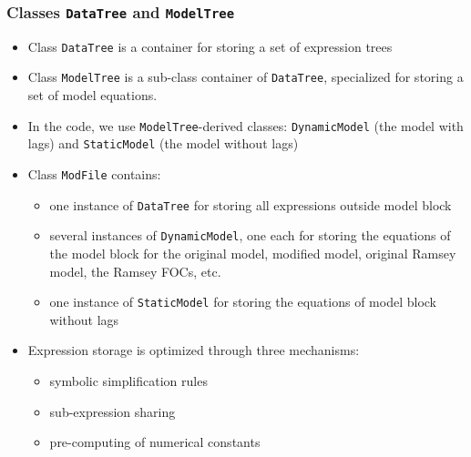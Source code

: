 \documentclass{beamer}
\begin{document}
\begin{frame}
  \frametitle{Classes \texttt{DataTree} and \texttt{ModelTree}}
  \begin{itemize}
  \item Class \texttt{DataTree} is a container for storing a set of expression trees
  \item Class \texttt{ModelTree} is a sub-class container of \texttt{DataTree}, specialized for storing a set of model equations.
  \item In the code, we use \texttt{ModelTree}-derived classes: \texttt{DynamicModel} (the model with lags) and \texttt{StaticModel} (the model without lags)
  \item Class \texttt{ModFile} contains:
    \begin{itemize}
    \item one instance of \texttt{DataTree} for storing all expressions outside model block
    \item several instances of \texttt{DynamicModel}, one each for storing the equations of the model block for the original model, modified model, original Ramsey model, the Ramsey FOCs, etc.
    \item one instance of \texttt{StaticModel} for storing the equations of model block without lags
    \end{itemize}
  \item Expression storage is optimized through three mechanisms:
    \begin{itemize}
    \item symbolic simplification rules
    \item sub-expression sharing
    \item pre-computing of numerical constants
    \end{itemize}
  \end{itemize}
\end{frame}
\end{document}
